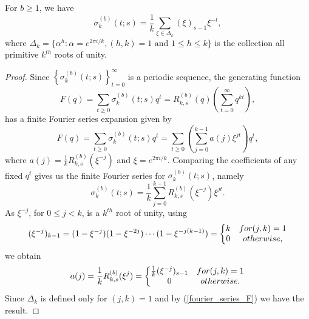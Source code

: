 \documentclass[10pt,a4paper]{amsart}
\begin{document}
\begin{lem} \label{lem_freq_1}
For $b\geq 1$, we have 
\begin{equation}\label{sigma_freq_1}
\sigma^{(b)}_{k}(t;s) = \frac{1}{k}\sum_{\xi\in \Delta_{k}} (\xi)_{s-1}\xi^{-t},     
\end{equation}
where $\Delta_{k}=\{\alpha^{h}:\alpha = e^{2\pi i/k}, (h,k)=1 \text{ and } 1\leq h\leq k\}$ is the collection all primitive $k^{th}$ roots of unity.     
\end{lem}

\begin{proof}
 Since $\left\{\sigma_{k}^{(b)}(t;s)\right\}_{t=0}^{\infty}$ is a periodic sequence, the generating function
$$
F(q)=\sum_{t\geq 0} \sigma_{k}^{(b)}(t;s) q^{t} = R_{k,s}^{(b)}(q)\left(\sum_{t=0}^{\infty}q^{kt}\right),
$$
has a finite Fourier series expansion given by 
\begin{equation}\label{fourier_series_F}
F(q) = \sum_{t\geq 0} \sigma_{k}^{(b)}(t;s) q^{t} = \sum_{t\geq 0} \left(\sum_{j=0}^{k-1} a(j)\xi^{jt}\right) q^{t},    
\end{equation}
where $a(j)=\frac{1}{k}R_{k,s}^{(b)}(\xi^{-j})$ and $\xi=e^{2\pi i/k}$. Comparing the coefficients of any fixed $q^{t}$ gives us the finite Fourier series for $\sigma_{k}^{(b)}(t;s)$, namely 
$$
\sigma_{k}^{(b)}(t;s) = \frac{1}{k}\sum_{j=0}^{k-1}R_{k,s}^{(b)}(\xi^{-j})\xi^{jt}.
$$
As $\xi^{-j}$, for $0\leq j<k$, is a $k^{th}$ root of unity, using  
$$
(\xi^{-j})_{k-1} = (1-\xi^{-j})(1-\xi^{-2j})\cdots (1-\xi^{-j(k-1)})= \left\{\begin{matrix} 
k & \textnormal{ for } (j,k)=1\\
0 & \textnormal { otherwise },
\end{matrix}\right. 
$$
we obtain
$$
a(j)=\frac{1}{k}R_{k,s}^{(b)}(\xi^{j})=\left\{\begin{matrix} 
\frac{1}{k}(\xi^{-j})_{s-1} & \textnormal{ for } (j,k)=1\\
0 & \textnormal { otherwise }. 
\end{matrix}\right.
$$
Since $\Delta_{k}$ is defined only for $(j,k)=1$ and by (\ref{fourier_series_F}) we have the result. 
\end{proof}
\end{document}
